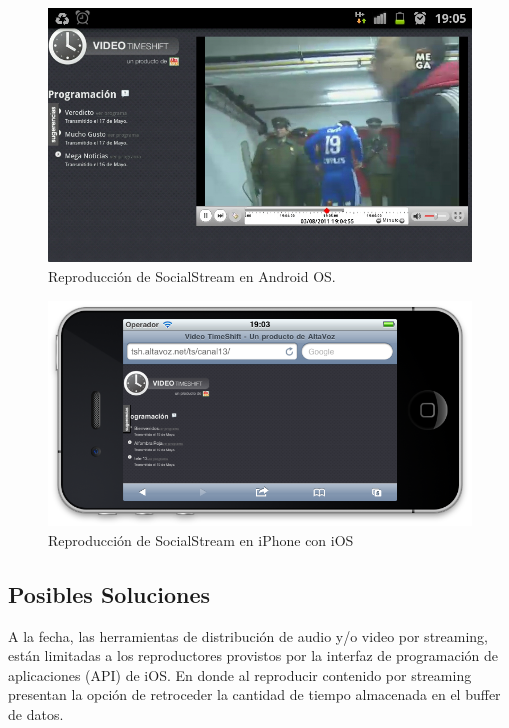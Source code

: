 \begin{figure}[h!]
	\centering
	 \includegraphics[scale=0.47]{imgs/sshot_Android_sstream.jpg}
 	\caption{Reproducción de SocialStream en Android OS.}
	\label{sshot_Android_sstream}
\end{figure}
\begin{figure}[h!]
	\centering
	\includegraphics[scale=0.55]{imgs/sshot_iOS_sstream.png}
	\caption{Reproducción de SocialStream en iPhone con iOS}
	\label{sshot_iOS_sstream}
\end{figure}

\newpage
\subsection{Posibles Soluciones}

A la fecha, las herramientas de distribución de audio y/o video por streaming, están limitadas a los reproductores provistos por la interfaz de programación de aplicaciones (API) de iOS. En donde al reproducir contenido por streaming presentan la opción de retroceder la cantidad de  tiempo almacenada en el buffer de datos. \\

